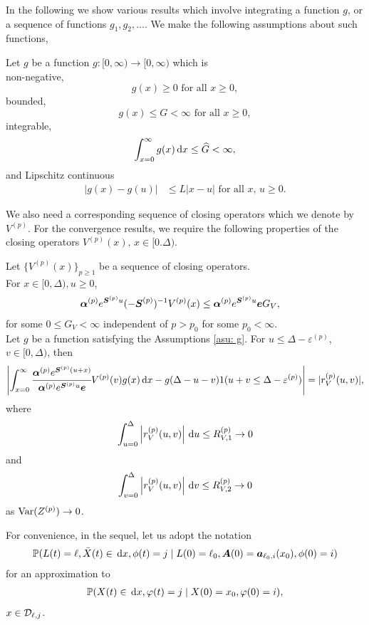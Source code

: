 In the following we show various results which involve integrating a function \(g\), or a sequence of functions \(g_1,g_2,\dots\). We make the following assumptions about such functions, 
\begin{asu}\label{asu: g}
	Let \(g\) be a function \(g:[0,\infty)\to [0,\infty)\) which is \\
	\subasu \label{asu: g non-neg} non-negative, 
	\[g(x) \geq 0 \mbox{ for all } x \geq 0,\]
	\subasu bounded, 
	\[g(x) \leq G < \infty \mbox{ for all } x \geq 0,\]
	\subasu integrable, 
	\[\int_{x=0}^\infty g(x)\, \mathrm{d} x \leq \widehat G < \infty,\]
	\subasu \label{asu: lipschitz} and Lipschitz continuous 
	\begin{align}
		|g(x) - g(u)|&\leq L|x - u| \mbox{ for all } x,\, u \geq 0.
	\end{align}
\end{asu}

We also need a corresponding sequence of closing operators which we denote by \(V^{(p)}\). For the convergence results, we require the following properties of the closing operators \(V^{(p)}(x),\, x \in[0.\Delta)\).
\begin{property}\label{properties: some props}
	Let \(\{V^{(p)}(x)\}_{p\geq 1}\) be a sequence of closing operators. \\
	\subproperty \label{properties: 1} For \(x\in[0,\Delta),u\geq 0\),  
        \begin{align*}
        		\boldsymbol \alpha^{(p)} e^{\boldsymbol S^{(p)}u}(-\boldsymbol S^{(p)})^{-1} V^{(p)}(x) &\leq \boldsymbol \alpha^{(p)} e^{\boldsymbol S^{(p)}u} \boldsymbol e G_V,
	\end{align*}
	for some \(0\leq G_V<\infty\) independent of \(p>p_0\) for some \(p_0<\infty\). \\
	\subproperty \label{properties: 2} Let \(g\) be a function satisfying the Assumptions \ref{asu: g}. For \(u\leq \Delta-\varepsilon^{(p)}\), \(v\in[0,\Delta)\), then
	\[\left|\int_{x=0}^\infty \cfrac{\boldsymbol \alpha^{(p)} e^{\boldsymbol{S}^{(p)}(u+x)} }{\boldsymbol \alpha^{(p)} e^{\boldsymbol{S}^{(p)}u} \boldsymbol e} V^{(p)}(v)g(x)\, \mathrm{d} x -g(\Delta-u-v) 1(u+v\leq\Delta-\varepsilon^{(p)})\right| =  |r_V^{(p)}(u,v)|,\]
	where 
	\[ \int_{u=0}^{\Delta}\left| r_V^{(p)}(u,v)\right| \, \mathrm{d} u  \leq R_{V,1}^{(p)} \to 0\]
	and 
	\[ \int_{v=0}^{\Delta}\left| r_V^{(p)}(u,v)\right| \, \mathrm{d} v  \leq R_{V,2}^{(p)} \to 0\]
	as \(\mathrm{Var}(Z^{(p)})\to 0\). 
\end{property}

For convenience, in the sequel, let us adopt the notation 
\begin{align}
	\mathbb P(L(t) = \ell, \bar X(t)\in\, \mathrm{d} x, \phi(t) = j\mid L(0)=\ell_0, \boldsymbol A(0) = \boldsymbol  a_{\ell_0,i}(x_0), \phi(0) = i) 
\end{align}
for an approximation to 
\begin{align}
	\mathbb P(X(t)\in\, \mathrm{d} x, \varphi(t) = j\mid X(0)=x_0, \varphi(0) = i),
\end{align}
\(x\in \mathcal{D}_{\ell,j}\).

